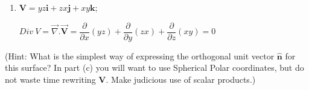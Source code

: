 \documentclass[fleqn]{article}
\begin{document}
\begin{enumerate}
\begin{enumerate}
        \item $\mathbf{V}=yz\mathbf{i}+zx\mathbf{j}+xy\mathbf{k}$;

          \textcolor{hwColor}{
            $
              Div ~ V=\overrightarrow{\nabla}.\overrightarrow{\mathbf{V}}=\dfrac{\partial}{\partial x}(yz)+\dfrac{\partial}{\partial y}(zx)+\dfrac{\partial}{\partial z}(xy)=0
            $
          }

      \end{enumerate}
      (Hint: What is the simplest way of expressing the orthogonal unit vector $\mathbf{\hat n}$ for this surface? In part (c) you will want to use Spherical Polar coordinates, but do not waste time rewriting $\mathbf{V}$. Make judicious use of scalar products.)

  \end{enumerate}

  \pagebreak
\end{document}
